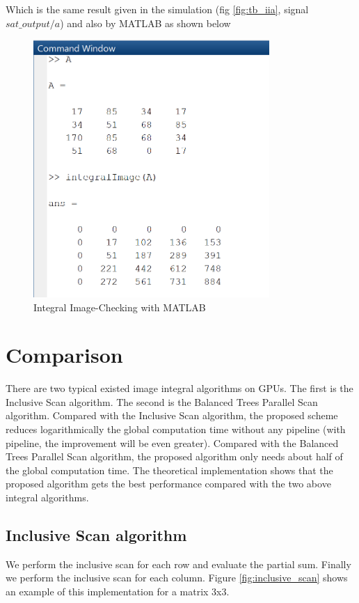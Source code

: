      Which is the same result given in the simulation (fig \ref{fig:tb_iia}, signal $ sat\_output/a $) and also by MATLAB as shown below
      \begin{figure}[h!]
      	\centering	
      	\includegraphics[width=0.8\textwidth]{imm/iia/iia_mat.png}  
      	\caption{Integral Image-Checking with MATLAB} 
      	\label{fig:iia_mat}
      \end{figure}
 \clearpage
 \section{Comparison}
 There are two typical existed image integral algorithms on GPUs. The first is the Inclusive Scan algorithm. The second is the Balanced Trees Parallel Scan algorithm. Compared with the Inclusive Scan algorithm, the proposed scheme reduces logarithmically the global computation time without any pipeline (with pipeline, the improvement will be even greater). Compared with the Balanced Trees Parallel Scan algorithm, the proposed algorithm only needs about half of the global computation time.
 The theoretical implementation shows that the proposed algorithm gets the best performance compared with the two above integral algorithms.
 
 
 \subsection{Inclusive Scan algorithm}
 We perform the inclusive scan for each row and evaluate the partial sum.
 Finally we perform the inclusive scan for each column.
 Figure \ref{fig:inclusive_scan} shows an example of this implementation for a matrix 3x3.
 
